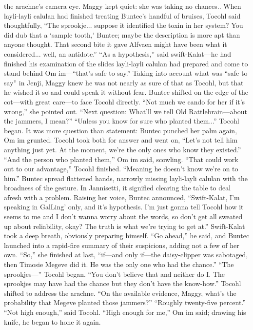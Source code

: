 \documentclass[9pt]{article}
\begin{document}
the arachne’s camera eye. Maggy kept quiet: she was taking no chances..
When layli-layli calulan had finished treating Buntec’s handful of bruises, Tocohl said thoughtfully,
“The sprookje... suppose it identified the toxin in her system? You did dub that a ‘sample tooth,’
Buntec; maybe the description is more apt than anyone thought. That second bite it gave Alfvaen might
have been what it considered... well, an antidote.”
“As a hypothesis,” said swift-Kalat—he had finished his examination of the slides layli-layli calulan
had prepared and come to stand behind Om im—“that’s safe to say.”
Taking into account what was “safe to say” in Jenji, Maggy knew he was not nearly as sure of that as
Tocohl, but that he wished it so and could speak it without fear.
Buntec shifted on the edge of the cot—with great care—to face Tocohl directly. “Not much we cando for her if it’s wrong,” she pointed out. “Next question: What’ll we tell Old Rattlebrain—about the
jammers, I mean?”
“Unless you know for sure who planted them...” Tocohl began. It was more question than statement:
Buntec punched her palm again, Om im grunted. Tocohl took both for answer and went on, “Let’s not
tell him anything just yet. At the moment, we’re the only ones who know they existed.”
“And the person who planted them,” Om im said, scowling.
“That could work out to our advantage,” Tocohl finished.
“Meaning he doesn’t know we’re on to him.” Buntec spread flattened hands, narrowly missing
layli-layli calulan with the broadness of the gesture. In Jannisetti, it signified clearing the table to deal
afresh with a problem.
Raising her voice, Buntec announced, “Swift-Kalat, I’m speaking in GalLing’ only, and it’s
hypothesis. I’m just gonna tell Tocohl how it seems to me and I don’t wanna worry about the words, so
don’t get all sweated up about reliability, okay? The truth is what we’re trying to get at.” Swift-Kalat
took a deep breath, obviously preparing himself. “Go ahead,” he said, and Buntec launched into a
rapid-fire summary of their suspicions, adding not a few of her own.
“So,” she finished at last, “if—and only if—the daisy-clipper was sabotaged, then Timosie Megeve
did it. He was the only one who had the chance.”
“The sprookjes—” Tocohl began.
“You don’t believe that and neither do I. The sprookjes may have had the chance but they don’t
have the know-how.”
Tocohl shifted to address the arachne. “On the available evidence, Maggy, what’s the probability that
Megeve planted those jammers?”
“Roughly twenty-five percent.”
“Not high enough,” said Tocohl.
“High enough for me,” Om im said; drawing his knife, he began to hone it again.
\end{document}
